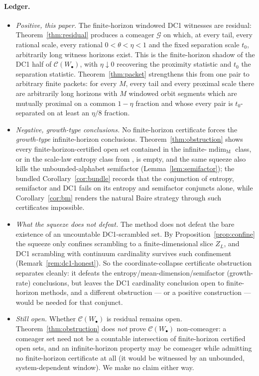\documentclass[11pt]{article}
\newcommand{\Gcal}{\mathcal{G}}
\newcommand{\mdim}{\operatorname{mdim}_{\mathrm M}}
\begin{document}
\paragraph{Ledger.}
\begin{itemize}
\item[(i)] \emph{Positive, this paper.}  The finite-horizon windowed DC1 witnesses are
residual: Theorem~\ref{thm:residual} produces a comeager $\Gcal$ on which, at every
tail, every rational scale, every rational \(0<\theta<\eta<1\) and the fixed separation scale
\(t_0\), arbitrarily long witness horizons exist.  This is the finite-horizon shadow of the DC1
half of $\mathcal C(W_\bullet)$, with $\eta\downarrow0$ recovering the proximity
statistic and $t_0$ the separation statistic.  Theorem~\ref{thm:packet} strengthens
this from one pair to arbitrary finite packets: for every \(M\), every tail and every
proximal scale there are arbitrarily long horizons with \(M\) windowed orbit segments
which are mutually proximal on a common \(1-\eta\) fraction and whose every pair is
\(t_0\)-separated on at least an \(\eta/8\) fraction.
\item[(ii)] \emph{Negative, growth-type conclusions.}  No finite-horizon certificate
forces the \emph{growth-type} infinite-horizon conclusions.  Theorem~\ref{thm:obstruction}
shows every finite-horizon-certified open set contained in the infinite-\(\mdim\) class,
or in the scale-law entropy class from \cite{Shmalo2026}, is empty, and the same squeeze
also kills the unbounded-alphabet semifactor (Lemma~\ref{lem:semifactor}); the bundled
Corollary~\ref{cor:bundle} records that the conjunction of entropy, semifactor and DC1
fails on its entropy and semifactor conjuncts alone, while Corollary~\ref{cor:bm} renders
the natural Baire strategy through such certificates impossible.
\item[(ii$'$)] \emph{What the squeeze does \emph{not} defeat.}  The method does not defeat
the bare existence of an uncountable DC1-scrambled set.  By
Proposition~\ref{prop:confine} the squeeze only confines scrambling to a finite-dimensional
slice $Z_L$, and DC1 scrambling with continuum cardinality survives such confinement
(Remark~\ref{rem:dc1-honest}).  So the coordinate-collapse certificate obstruction
separates cleanly: it defeats the entropy/mean-dimension/semifactor (growth-rate)
conclusions, but leaves the DC1 cardinality conclusion open to finite-horizon methods, and
a different obstruction --- or a positive construction --- would be needed for that
conjunct.
\item[(iii)] \emph{Still open.}  Whether $\mathcal C(W_\bullet)$ is residual remains
open.  Theorem~\ref{thm:obstruction} does \emph{not} prove $\mathcal C(W_\bullet)$
non-comeager: a comeager set need not be a countable intersection of finite-horizon
certified open sets, and an infinite-horizon property may be comeager while admitting no
finite-horizon certificate at all (it would be witnessed by an unbounded, system-dependent
window).  We make no claim either way.
\end{itemize}
\end{document}
